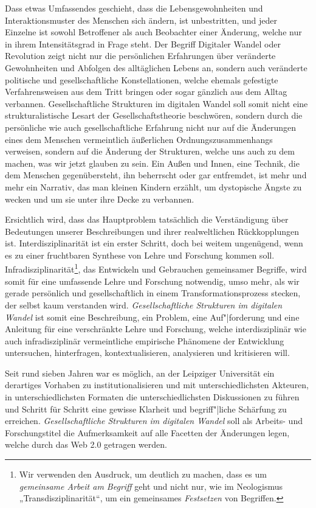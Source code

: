 \documentclass[a4paper,11pt]{article}
\begin{document}
Dass etwas Umfassendes geschieht, dass die Lebensgewohnheiten und
Interaktionsmuster des Menschen sich ändern, ist unbestritten, und jeder
Einzelne ist sowohl Betroffener als auch Beobachter einer Änderung, welche nur
in ihrem Intensitätsgrad in Frage steht. Der Begriff Digitaler Wandel oder
Revolution zeigt nicht nur die persönlichen Erfahrungen über veränderte
Gewohnheiten und Abfolgen des alltäglichen Lebens an, sondern auch veränderte
politische und gesellschaftliche Konstellationen, welche ehemals gefestigte
Verfahrensweisen aus dem Tritt bringen oder sogar gänzlich aus dem Alltag
verbannen. Gesellschaftliche Strukturen im digitalen Wandel soll somit nicht
eine strukturalistische Lesart der Gesellschaftstheorie beschwören, sondern
durch die persönliche wie auch gesellschaftliche Erfahrung nicht nur auf die
Änderungen eines dem Menschen vermeintlich äußerlichen Ordnungszusammenhangs
verweisen, sondern auf die Änderung der Strukturen, welche uns auch zu dem
machen, was wir jetzt glauben zu sein. Ein Außen und Innen, eine Technik, die
dem Menschen gegenübersteht, ihn beherrscht oder gar entfremdet, ist mehr und
mehr ein Narrativ, das man kleinen Kindern erzählt, um dystopische Ängste zu
wecken und um sie unter ihre Decke zu verbannen.

Ersichtlich wird, dass das Hauptproblem tatsächlich die Verständigung über
Bedeutungen unserer Beschreibungen und ihrer realweltlichen Rückkopplungen
ist.  Interdisziplinarität ist ein erster Schritt, doch bei weitem ungenügend,
wenn es zu einer fruchtbaren Synthese von Lehre und Forschung kommen soll.
Infradisziplinarität\footnote{Wir verwenden den Ausdruck, um deutlich zu
  machen, dass es um \emph{gemeinsame Arbeit am Begriff} geht und nicht nur,
  wie im Neologismus „Transdisziplinarität“, um ein gemeinsames
  \emph{Festsetzen} von Begriffen.}, das Entwickeln und Gebrauchen gemeinsamer
Begriffe, wird somit für eine umfassende Lehre und Forschung notwendig, umso
mehr, als wir gerade persönlich und gesellschaftlich in einem
Transformationsprozess stecken, der selbst kaum verstanden
wird. \emph{Gesellschaftliche Strukturen im digitalen Wandel} ist somit eine
Beschreibung, ein Problem, eine Auf"|forderung und eine Anleitung für eine
verschränkte Lehre und Forschung, welche interdisziplinär wie auch
infradisziplinär vermeintliche empirische Phänomene der Entwicklung
untersuchen, hinterfragen, kontextualisieren, analysieren und kritisieren
will.

Seit rund sieben Jahren war es möglich, an der Leipziger Universität ein
derartiges Vorhaben zu institutionalisieren und mit unterschiedlichsten
Akteuren, in unterschiedlichsten Formaten die unterschiedlichsten Diskussionen
zu führen und Schritt für Schritt eine gewisse Klarheit und begriff"|liche
Schärfung zu erreichen. \emph{Gesellschaftliche Strukturen im digitalen
  Wandel} soll als Arbeits- und Forschungstitel die Aufmerksamkeit auf alle
Facetten der Änderungen legen, welche durch das Web 2.0 getragen werden.
\enlargethispage{1em}
\end{document}
